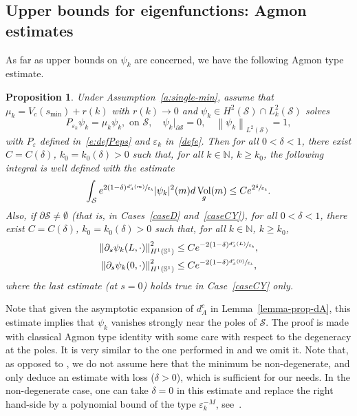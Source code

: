 \documentclass[JEP,XML,SOM,Unicode]{cedram}
\newtheorem{proposition}[lemma]{Proposition}
\theoremstyle{definition}
\newcommand{\calS}{\ensuremath{\mathcal S}}
\newcommand{\mb}[1]{\ensuremath{\mathbb{#1}}}
\newcommand{\N}{{\mb{N}}}
\newcommand{\bS}{\ensuremath{\mathbb S}}
\DeclareMathOperator{\Vol}{Vol}
\newcommand\nor[2]{\left\|#1\right\|_{#2}}
\newcommand{\ce}{c}
\let\d\partial
\let\e\varepsilon
\let\eps\varepsilon
\begin{document}
\subsection{Upper bounds for eigenfunctions: Agmon estimates}
\label{s:surf-Agmon}
As far as upper bounds on $\psi_k$ are concerned, we have the following Agmon type estimate.
\begin{proposition}
\label{p:Agmon-revolution}
Under Assumption~\ref{a:single-min}, assume that $\mu_k = V_\ce(s_{\min}) +r(k)$ with $r(k)\to 0$ and $\psi_k \in H^2 (\mathcal{S})\cap L^2_k(\calS)$ solves
\[
P_{\e_k}\psi_k=\mu_k \psi_k, \text{ on } \calS, \quad \psi_k|_{\d\calS} = 0,\quad \nor{\psi_k}{L^2(\calS)}=1,
\]
with $P_\eps$ defined in~\eqref{e:defPeps} and $\e_k$ in~\eqref{defe}. Then for all $0<\delta< 1$, there exist $C=C(\delta)$, $k_0=k_0(\delta)>0$ such that, for all $k \in \N$, $k \geq k_0$, the following integral is well defined with the estimate
\[
\int_{\calS} e^{2(1-\delta)\sfrac{ d_A^{\ce}(m)}{\e_k}} |\psi_k|^2(m) d\Vol_g(m)
\leq C e^{2\sfrac{\delta}{\e_k}}.
\]
Also, if $\d\calS \neq \emptyset$ (that is, in Cases~\ref{caseD} and~\ref{caseCY}), for all $0<\delta< 1$, there exist $C=C(\delta)$, $k_0=k_0(\delta)>0$ such that, for all $k \in \N$, $k \geq k_0$,
\begin{equation}
\label{e:estimate-psik-bord}
\begin{split}
\nor{\d_s \psi_k(L,\cdot)}{H^1(\bS^1)}^2
&\leq C e^{- 2(1-\delta)\sfrac{ d_A^{\ce}(L)}{\e_k}}, \\
\nor{\d_s \psi_k(0,\cdot)}{H^1(\bS^1)}^2
&\leq C e^{- 2(1-\delta)\sfrac{ d_A^{\ce}(0)}{\e_k}},
\end{split}
\end{equation}
where the last estimate (at $s=0$) holds true in Case~\ref{caseCY} only.
\end{proposition}
Note that given the asymptotic expansion of $d_A^{\ce}$ in Lemma~\ref{lemma-prop-dA}, this estimate implies that $\psi_k$ vanishes strongly near the poles of $\calS$.
The proof is made with classical Agmon type identity with some care with respect to the degeneracy at the poles. It is very similar to the one performed in \cite[Th.\,3.9]{LL:18} and we omit it. Note that, as opposed to \cite[Th.\,3.9]{LL:18}, we do not assume here that the minimum be non-degenerate, and only deduce an estimate with loss ($\delta>0$), which is sufficient for our needs. In the non-degenerate case, one can take $\delta=0$ in this estimate and replace the right hand-side by a polynomial bound of the type $\e_k^{-M}$, see~\cite[Th.\,3.9]{LL:18}.
\end{document}
